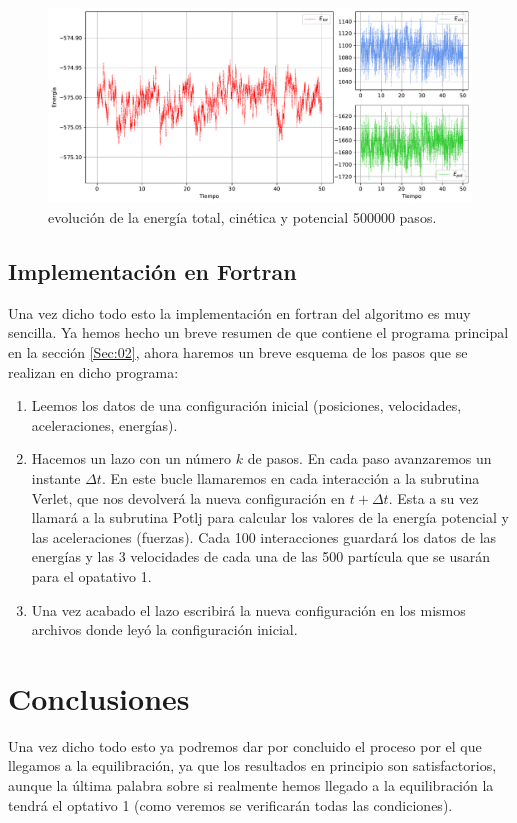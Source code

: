 \documentclass[11pt]{article} %
\begin{document}
\begin{figure}[h!] \centering
	\includegraphics[width=1.0\textwidth]{../../Graficas/Et-equilibra-500K-2.pdf}
	\caption{evolución de la energía total, cinética y potencial 500000 pasos.}
	\label{Fig:03}
\end{figure}	

\subsection{Implementación en Fortran}

Una vez dicho todo esto la implementación en fortran del algoritmo es muy sencilla. Ya hemos hecho un breve resumen de que contiene el programa principal en la sección \ref{Sec:02}, ahora haremos un breve esquema de los pasos que se realizan en dicho programa:

\begin{enumerate}
\item Leemos los datos de una configuración inicial (posiciones, velocidades, aceleraciones, energías).
\item Hacemos un lazo con un número $k$ de pasos. En cada paso avanzaremos un instante $\Delta t$. En este bucle llamaremos en cada interacción a la subrutina Verlet, que nos devolverá la nueva configuración en $t+\Delta t$. Esta a su vez llamará a la subrutina Potlj para calcular los valores de la energía potencial y las aceleraciones (fuerzas). Cada 100 interacciones guardará los datos de las energías y las 3 velocidades de cada una de las 500 partícula que se usarán para el opatativo 1.
\item Una vez acabado el lazo escribirá la nueva configuración en los mismos archivos donde leyó la configuración inicial.
\end{enumerate}

\section{Conclusiones}

Una vez dicho todo esto ya podremos dar por concluido el proceso por el que llegamos a la equilibración, ya que los resultados en principio son satisfactorios, aunque la última palabra sobre si realmente hemos llegado a la equilibración la tendrá el optativo 1 (como veremos se verificarán todas las condiciones).




	
\end{document}
